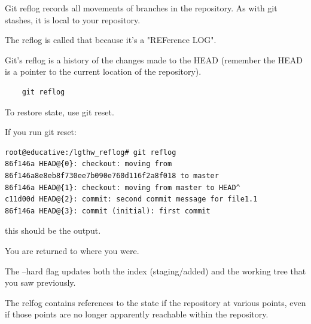 \documentclass{report}
\begin{document}
Git reflog records all movements of branches in the repository. As with git stashes, it is local to your repository.

The reflog is called that because it's a "REFerence LOG".

Git's reflog is a history of the changes made to the HEAD (remember the HEAD is a pointer to the current location of the repository).

\begin{lstlisting}
    git reflog
\end{lstlisting}

To restore state, use git reset.

If you run git reset:

\begin{lstlisting}
root@educative:/lgthw_reflog# git reflog
86f146a HEAD@{0}: checkout: moving from 86f146a8e8eb8f730ee7b090e760d116f2a8f018 to master
86f146a HEAD@{1}: checkout: moving from master to HEAD^
c11d00d HEAD@{2}: commit: second commit message for file1.1
86f146a HEAD@{3}: commit (initial): first commit
\end{lstlisting}
this should be the output.

You are returned to where you were.

The --hard flag updates both the index (staging/added) and the working tree that you saw previously.

The relfog contains references to the state if the repository at various points, even if those points are no longer apparently reachable within the repository.
\end{document}
